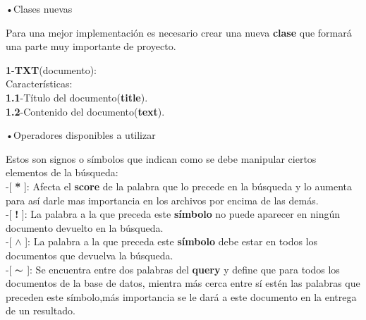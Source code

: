 \documentclass[11pt]{beamer}
\begin{document}
\begin{frame}{•Clases nuevas}
\begin{center}
Para una mejor implementación es necesario crear una nueva \textbf{clase} que formará una parte muy importante de proyecto.

\end{center}
\begin{center}
\textbf{1}-\textbf{TXT}(documento):\\
Características:\\
\textbf{1.1}-Título del documento(\textbf{title}).\\
\textbf{1.2}-Contenido del documento(\textbf{text}).

\end{center}

\end{frame}
\begin{frame}{•Operadores disponibles a utilizar}

Estos son signos o símbolos que indican como se debe manipular ciertos elementos de la búsqueda:\\
-[ \textbf{*} ]:  Afecta el \textbf{score} de la palabra que lo precede en la búsqueda y lo aumenta
para así darle mas importancia en los archivos por encima de las demás.\\

-[ \textbf{!} ]:  La palabra a la que preceda este \textbf{símbolo} no puede aparecer en ningún
documento devuelto en la búsqueda.\\

-[ \textbf{$\wedge$} ]:  La palabra a la que preceda este \textbf{símbolo} debe estar en todos los
documentos que devuelva la búsqueda.\\

-[ \textbf{$\thicksim$} ]:  Se encuentra entre dos palabras del \textbf{query} y define que para todos los
documentos de la base de datos, mientra más cerca entre sí estén las palabras
que preceden este símbolo,más importancia se le dará a este documento en la
entrega de un resultado.



\end{frame}
\end{document}
